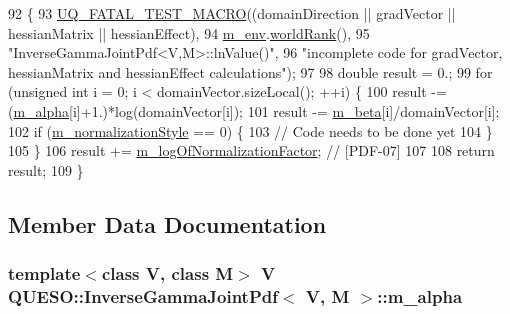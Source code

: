 \begin{DoxyCode}
92 \{
93   \hyperlink{_defines_8h_a56d63d18d0a6d45757de47fcc06f574d}{UQ\_FATAL\_TEST\_MACRO}((domainDirection || gradVector || hessianMatrix || hessianEffect),
94                       \hyperlink{class_q_u_e_s_o_1_1_base_scalar_function_adf44141aeb765d97613286f88f235f04}{m\_env}.\hyperlink{class_q_u_e_s_o_1_1_base_environment_a78b57112bbd0e6dd0e8afec00b40ffa7}{worldRank}(),
95                       \textcolor{stringliteral}{"InverseGammaJointPdf<V,M>::lnValue()"},
96                       \textcolor{stringliteral}{"incomplete code for gradVector, hessianMatrix and hessianEffect calculations"});
97 
98   \textcolor{keywordtype}{double} result = 0.;
99   \textcolor{keywordflow}{for} (\textcolor{keywordtype}{unsigned} \textcolor{keywordtype}{int} i = 0; i < domainVector.sizeLocal(); ++i) \{
100     result -= (\hyperlink{class_q_u_e_s_o_1_1_inverse_gamma_joint_pdf_a37f266451b387acdbdd1197de3229662}{m\_alpha}[i]+1.)*log(domainVector[i]);
101     result -= \hyperlink{class_q_u_e_s_o_1_1_inverse_gamma_joint_pdf_a599b413c540f5b8bae0482ff626e3562}{m\_beta}[i]/domainVector[i];
102     \textcolor{keywordflow}{if} (\hyperlink{class_q_u_e_s_o_1_1_base_joint_pdf_a138c99bcef7a67077d9612bddfdcb896}{m\_normalizationStyle} == 0) \{
103       \textcolor{comment}{// Code needs to be done yet}
104     \}
105   \}
106   result += \hyperlink{class_q_u_e_s_o_1_1_base_joint_pdf_ae82d4191f17af8c7a26226d127bc7850}{m\_logOfNormalizationFactor}; \textcolor{comment}{// [PDF-07]}
107 
108   \textcolor{keywordflow}{return} result;
109 \}
\end{DoxyCode}


\subsection{Member Data Documentation}
\hypertarget{class_q_u_e_s_o_1_1_inverse_gamma_joint_pdf_a37f266451b387acdbdd1197de3229662}{
\subsubsection[{m\-\_\-alpha}]{\setlength{\rightskip}{0pt plus 5cm}template$<$class V, class M$>$ V {\bf Q\-U\-E\-S\-O\-::\-Inverse\-Gamma\-Joint\-Pdf}$<$ V, M $>$\-::m\-\_\-alpha\hspace{0.3cm}{\ttfamily [protected]}}}\label{class_q_u_e_s_o_1_1_inverse_gamma_joint_pdf_a37f266451b387acdbdd1197de3229662}


